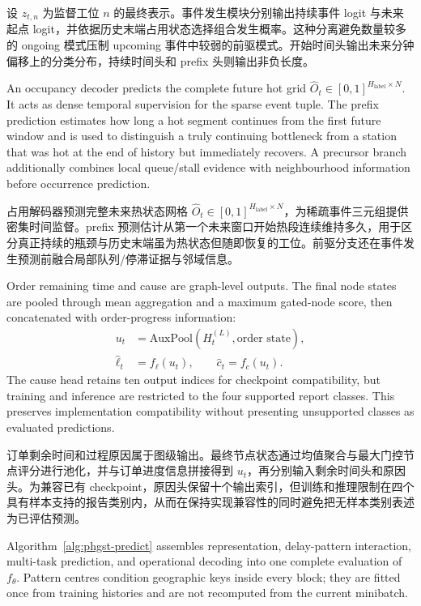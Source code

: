 \documentclass[a4paper,fleqn]{cas-dc}
\newcommand{\zhpara}[1]{%
  \par\begingroup\small\color{black!72}\noindent #1\par\endgroup}
\begin{document}
\zhpara{设 $z_{t,n}$ 为监督工位 $n$ 的最终表示。事件发生模块分别输出持续事件 logit 与未来起点 logit，并依据历史末端占用状态选择组合发生概率。这种分离避免数量较多的 ongoing 模式压制 upcoming 事件中较弱的前驱模式。开始时间头输出未来分钟偏移上的分类分布，持续时间头和 prefix 头则输出非负长度。}

An occupancy decoder predicts the complete future hot grid $\hat O_t\in[0,1]^{H_{\mathrm{label}}\times N}$. It acts as dense temporal supervision for the sparse event tuple. The prefix prediction estimates how long a hot segment continues from the first future window and is used to distinguish a truly continuing bottleneck from a station that was hot at the end of history but immediately recovers. A precursor branch additionally combines local queue/stall evidence with neighbourhood information before occurrence prediction.

\zhpara{占用解码器预测完整未来热状态网格 $\hat O_t\in[0,1]^{H_{\mathrm{label}}\times N}$，为稀疏事件三元组提供密集时间监督。prefix 预测估计从第一个未来窗口开始热段连续维持多久，用于区分真正持续的瓶颈与历史末端虽为热状态但随即恢复的工位。前驱分支还在事件发生预测前融合局部队列/停滞证据与邻域信息。}

Order remaining time and cause are graph-level outputs. The final node states are pooled through mean aggregation and a maximum gated-node score, then concatenated with order-progress information:
\begin{equation}
\begin{aligned}
u_t&=\mathrm{AuxPool}(H_t^{(L)},\text{order state}),\\
\hat\ell_t&=f_\ell(u_t),\qquad \hat c_t=f_c(u_t).
\end{aligned}
\end{equation}
The cause head retains ten output indices for checkpoint compatibility, but training and inference are restricted to the four supported report classes. This preserves implementation compatibility without presenting unsupported classes as evaluated predictions.

\zhpara{订单剩余时间和过程原因属于图级输出。最终节点状态通过均值聚合与最大门控节点评分进行池化，并与订单进度信息拼接得到 $u_t$，再分别输入剩余时间头和原因头。为兼容已有 checkpoint，原因头保留十个输出索引，但训练和推理限制在四个具有样本支持的报告类别内，从而在保持实现兼容性的同时避免把无样本类别表述为已评估预测。}

Algorithm~\ref{alg:phgst-predict} assembles representation, delay-pattern interaction, multi-task prediction, and operational decoding into one complete evaluation of $f_{\theta}$. Pattern centres condition geographic keys inside every block; they are fitted once from training histories and are not recomputed from the current minibatch.
\end{document}
